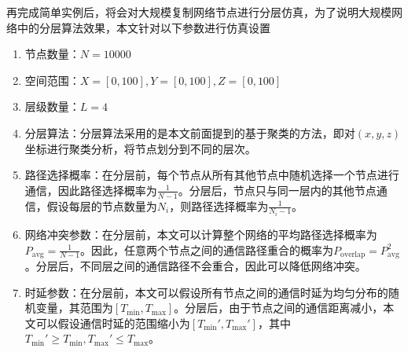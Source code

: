 \documentclass[UTF8,a4paper,12pt]{ctexart}
\numberwithin{equation}{section}
\begin{document}
再完成简单实例后，将会对大规模复制网络节点进行分层仿真，为了说明大规模网络中的分层算法效果，本文针对以下参数进行仿真设置
\begin{enumerate}
	\item 节点数量：$N = 10000$
	\item 空间范围：$X = [0, 100], Y = [0, 100], Z = [0, 100]$
	\item 层级数量：$L = 4$
	\item 分层算法：分层算法采用的是本文前面提到的基于聚类的方法，即对$(x, y, z)$坐标进行聚类分析，将节点划分到不同的层次。
	\item 路径选择概率：在分层前，每个节点从所有其他节点中随机选择一个节点进行通信，因此路径选择概率为$\frac{1}{N-1}$。分层后，节点只与同一层内的其他节点通信，假设每层的节点数量为$N_i$，则路径选择概率为$\frac{1}{N_i-1}$。
	\item 网络冲突参数：在分层前，本文可以计算整个网络的平均路径选择概率为$P_{\text{avg}} = \frac{1}{N-1}$。因此，任意两个节点之间的通信路径重合的概率为$P_{\text{overlap}} = P_{\text{avg}}^2$。分层后，不同层之间的通信路径不会重合，因此可以降低网络冲突。
	\item 时延参数：在分层前，本文可以假设所有节点之间的通信时延为均匀分布的随机变量，其范围为$[T_{\text{min}}, T_{\text{max}}]$。分层后，由于节点之间的通信距离减小，本文可以假设通信时延的范围缩小为$[T_{\text{min}}', T_{\text{max}}']$，其中$T_{\text{min}}' \ge T_{\text{min}}, T_{\text{max}}' \le T_{\text{max}}$。
\end{enumerate}
\begin{figure}[H] 
\end{figure}
\end{document}
